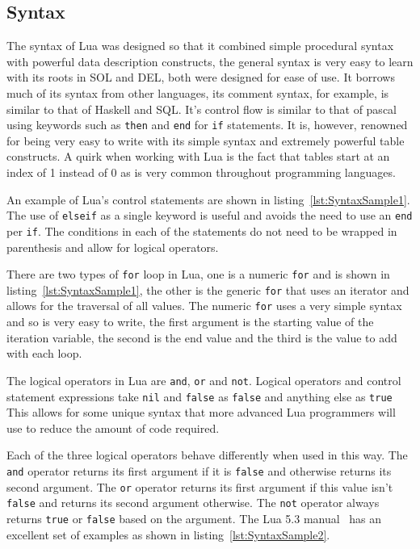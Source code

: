 \documentclass[11pt,a4paper,titlepage]{report}
\begin{document}
\subsection{Syntax}
	The syntax of Lua was designed so that it combined simple procedural syntax with powerful data description constructs, the general syntax is very easy to learn with its roots in SOL and DEL, both were designed for ease of use. It borrows much of its syntax from other languages, its comment syntax, for example, is similar to that of Haskell and SQL. It's control flow is similar to that of pascal using keywords such as \texttt{then} and \texttt{end} for \texttt{if} statements. It is, however, renowned for being very easy to write with its simple syntax and extremely powerful table constructs. A quirk when working with Lua is the fact that tables start at an index of 1 instead of 0 as is very common throughout programming languages.

	An example of Lua's control statements are shown in listing~\ref{lst:SyntaxSample1}. The use of \texttt{elseif} as a single keyword is useful and avoids the need to use an \texttt{end} per \texttt{if}. The conditions in each of the statements do not need to be wrapped in parenthesis and allow for logical operators. 

	\singlespacing
	
	\onehalfspacing

	There are two types of \texttt{for} loop in Lua, one is a numeric \texttt{for} and is shown in listing~\ref{lst:SyntaxSample1}, the other is the generic \texttt{for} that uses an iterator and allows for the traversal of all values. The numeric \texttt{for} uses a very simple syntax and so is very easy to write, the first argument is the starting value of the iteration variable, the second is the end value and the third is the value to add with each loop.

	The logical operators in Lua are \texttt{and}, \texttt{or} and \texttt{not}. Logical operators and control statement expressions take \texttt{nil} and \texttt{false} as \texttt{false} and anything else as \texttt{true}~\cite{LuaMan} This allows for some unique syntax that more advanced Lua programmers will use to reduce the amount of code required.

	Each of the three logical operators behave differently when used in this way. The \texttt{and} operator returns its first argument if it is \texttt{false} and otherwise returns its second argument. The \texttt{or} operator returns its first argument if this value isn't \texttt{false} and returns its second argument otherwise. The \texttt{not} operator always returns \texttt{true} or \texttt{false} based on the argument. The Lua 5.3 manual~\cite{LuaMan} has an excellent set of examples as shown in listing~\ref{lst:SyntaxSample2}.
	
\end{document}
